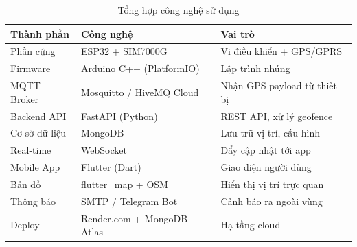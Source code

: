 \begin{table}[H]
\centering
\caption{Tổng hợp công nghệ sử dụng}
\label{tab:tech_summary}
\begin{tabularx}{\textwidth}{l l X}
\toprule
\textbf{Thành phần} & \textbf{Công nghệ} & \textbf{Vai trò} \\
\midrule
Phần cứng     & ESP32 + SIM7000G  & Vi điều khiển + GPS/GPRS \\
Firmware      & Arduino C++ (PlatformIO) & Lập trình nhúng \\
MQTT Broker   & Mosquitto / HiveMQ Cloud & Nhận GPS payload từ thiết bị \\
Backend API   & FastAPI (Python)   & REST API, xử lý geofence \\
Cơ sở dữ liệu & MongoDB           & Lưu trữ vị trí, cấu hình \\
Real-time     & WebSocket          & Đẩy cập nhật tới app \\
Mobile App    & Flutter (Dart)     & Giao diện người dùng \\
Bản đồ        & flutter\_map + OSM & Hiển thị vị trí trực quan \\
Thông báo     & SMTP / Telegram Bot & Cảnh báo ra ngoài vùng \\
Deploy        & Render.com + MongoDB Atlas & Hạ tầng cloud \\
\bottomrule
\end{tabularx}
\end{table}
